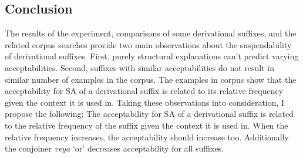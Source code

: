 \subsection{Conclusion}
The results of the experiment, comparisons of some derivational suffixes, and the related corpus searches provide two main observations about the suspendability of derivational suffixes. First, purely structural explanations can't predict varying acceptabilities. Second, suffixes with similar acceptabilities do not result in similar number of examples in the corpus. The examples in corpus show that the acceptability for SA of a derivational suffix is related to its relative frequency given the context it is used in. Taking these observations into consideration, I propose the following: The acceptability for SA of a derivational suffix is related to the relative frequency of the suffix given the context it is used in. When the relative frequency increases, the acceptability should increase too. Additionally the conjoiner \textit{veya} `or' decreases acceptability for all suffixes.











